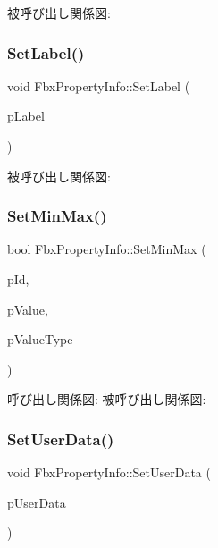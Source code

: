 被呼び出し関係図\+:
\mbox{\label{class_fbx_property_info_a6de44806bb42999c71d742412410ae37}} 
\subsubsection{\texorpdfstring{Set\+Label()}{SetLabel()}}
{\footnotesize\ttfamily void Fbx\+Property\+Info\+::\+Set\+Label (\begin{DoxyParamCaption}\item[{const char $\ast$}]{p\+Label }\end{DoxyParamCaption})}

被呼び出し関係図\+:
\mbox{\label{class_fbx_property_info_a9edba58ea8139407afbaf58d06ed03b4}} 
\subsubsection{\texorpdfstring{Set\+Min\+Max()}{SetMinMax()}}
{\footnotesize\ttfamily bool Fbx\+Property\+Info\+::\+Set\+Min\+Max (\begin{DoxyParamCaption}\item[{\hyperlink{class_fbx_property_info_a83069f079a29bde133f2e9324de5af43}{E\+Value\+Index}}]{p\+Id,  }\item[{const void $\ast$}]{p\+Value,  }\item[{\hyperlink{fbxpropertytypes_8h_a73913a5ddfb20e57c6f25e9e6784bd92}{E\+Fbx\+Type}}]{p\+Value\+Type }\end{DoxyParamCaption})}

呼び出し関係図\+:
被呼び出し関係図\+:
\mbox{\label{class_fbx_property_info_aab80f1b62d49a915018ea8aad93a2a77}} 
\subsubsection{\texorpdfstring{Set\+User\+Data()}{SetUserData()}}
{\footnotesize\ttfamily void Fbx\+Property\+Info\+::\+Set\+User\+Data (\begin{DoxyParamCaption}\item[{const void $\ast$}]{p\+User\+Data }\end{DoxyParamCaption})}

